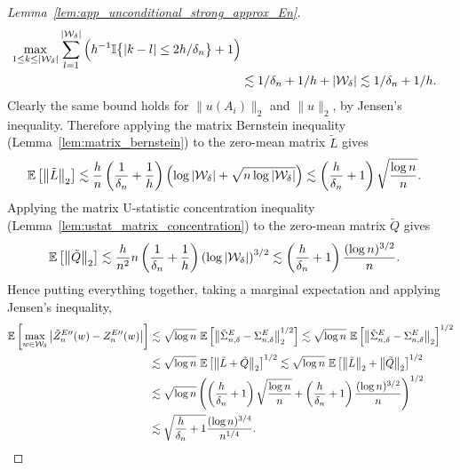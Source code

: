 \begin{proof}[Lemma~\ref{lem:app_unconditional_strong_approx_En}]
\begin{align*}
    \max_{1 \leq k \leq |\mathcal{W}_\delta|}
    \sum_{l=1}^{|\mathcal{W}_\delta|}
    \Big(
    h^{-1}
    \mathbb{I}\big\{ |k-l| \leq 2h/\delta_n \big\}
    + 1
    \Big) \\
    &\lesssim
    1/\delta_n
    + 1/h
    + |\mathcal{W}_\delta|
    \lesssim
    1/\delta_n
    + 1/h.
  \end{align*}
  Clearly the same bound holds for
  $\|u(A_i)\|_2$
  and $\|u\|_2$, by Jensen's inequality.
  Therefore applying the matrix Bernstein inequality
  (Lemma~\ref{lem:matrix_bernstein})
  to the zero-mean matrix $\tilde L$ gives
  \begin{align*}
    \mathbb{E}\left[
      \left\|
      \tilde L
      \right\|_2
    \right]
    &\lesssim
    \frac{h}{n}
    \left(\frac{1}{\delta_n} + \frac{1}{h} \right)
    \left(
      \log |\mathcal{W}_\delta| + \sqrt{n \log |\mathcal{W}_\delta|}
    \right)
    \lesssim
    \left(\frac{h}{\delta_n} + 1 \right)
    \sqrt{\frac{\log n}{n}}.
  \end{align*}
  Applying the matrix U-statistic concentration inequality
  (Lemma~\ref{lem:ustat_matrix_concentration})
  to the zero-mean matrix $\tilde Q$ gives
  \begin{align*}
    \mathbb{E}\left[
      \left\|
      \tilde Q
      \right\|_2
    \right]
    &\lesssim
    \frac{h}{n^2}
    n
    \left(\frac{1}{\delta_n} + \frac{1}{h} \right)
    \left(
      \log |\mathcal{W}_\delta|
    \right)^{3/2}
    \lesssim
    \left(\frac{h}{\delta_n} + 1 \right)
    \frac{(\log n)^{3/2}}{n}.
  \end{align*}
  Hence putting everything together,
  taking a marginal expectation
  and applying Jensen's inequality,
  \begin{align*}
    \mathbb{E}\left[
      \max_{w \in \mathcal{W}_\delta}
      \big|\tilde Z_n^{E\prime\prime}(w) - Z_n^{E\prime\prime}(w)\big|
    \right]
    &\lesssim
    \sqrt{\log n} \
    \mathbb{E}\left[
      \left\|
      \tilde\Sigma^E_{n,\delta} - \Sigma^E_{n,\delta}
      \right\|_2^{1/2}
    \right]
    \lesssim
    \sqrt{\log n} \
    \mathbb{E}\left[
      \left\|
      \tilde\Sigma^E_{n,\delta} - \Sigma^E_{n,\delta}
      \right\|_2
    \right]^{1/2} \\
    &\lesssim
    \sqrt{\log n} \
    \mathbb{E}\left[
      \left\|
      \tilde L
      + \tilde Q
      \right\|_2
    \right]^{1/2}
    \lesssim
    \sqrt{\log n} \
    \mathbb{E}\left[
      \left\|
      \tilde L
      \right\|_2
      + \left\|
      \tilde Q
      \right\|_2
    \right]^{1/2} \\
    &\lesssim
    \sqrt{\log n}
    \left(
      \left(\frac{h}{\delta_n} + 1 \right)
      \sqrt{\frac{\log n}{n}}
      + \left(\frac{h}{\delta_n} + 1 \right)
      \frac{(\log n)^{3/2}}{n}
    \right)^{1/2} \\
    &\lesssim
    \sqrt{\frac{h}{\delta_n} + 1}
    \frac{(\log n)^{3/4}}{n^{1/4}}.
  \end{align*}


\end{proof}
